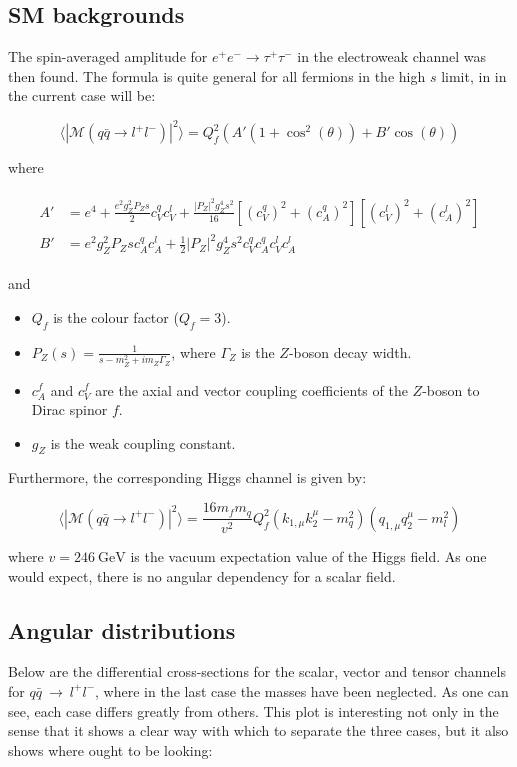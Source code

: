 \documentclass[11pt,a4paper]{article}
\begin{document}
\subsection{SM backgrounds}
The spin-averaged amplitude for $e^+e^- \rightarrow \tau^+\tau^-$ in the electroweak channel was then found. The formula is quite general for all fermions in the high $s$ limit, in in the current case will be:

\begin{equation}
	\langle|\mathcal{M}(q\bar{q}\rightarrow l^+l^-)|^2\rangle = Q_f^2\left(A'\left(1+\cos^2(\theta)\right) + B'\cos(\theta)\right)
\end{equation}

where

\begin{align}
	\begin{split}
	A' &= e^4 + \frac{e^2g_Z^2P_Zs}{2}c_V^qc_V^l + \frac{|P_Z|^2 g_Z^4 s^2}{16}\left[\left(c_V^q\right)^2 + \left(c_A^q\right)^2\right]\left[\left(c_V^l\right)^2 + \left(c_A^l\right)^2\right]\\
	B' &= e^2g_Z^2P_Zsc_A^qc_A^l + \frac{1}{2}|P_Z|^2g_Z^4s^2 c_V^qc_A^qc_V^l c_A^l
	\end{split}
\end{align}

and
\begin{itemize}
	\item $Q_f$ is the colour factor ($Q_f = 3$).
	\item $P_Z(s) = \frac{1}{s-m_Z^2 + im_Z\Gamma_Z}$, where $\Gamma_Z$ is the $Z$-boson decay width.
	\item $c^f_A$ and $c^f_V$ are the axial and vector coupling coefficients of the $Z$-boson to Dirac spinor $f$.
	\item $g_Z$ is the weak coupling constant.
\end{itemize}

Furthermore, the corresponding Higgs channel is given by:

\begin{equation}
	\langle|\mathcal{M}(q\bar{q}\rightarrow l^+l^-)|^2\rangle = \frac{16m_fm_q}{v^2}Q_f^2\left(k_{1,\mu}k_2^\mu - m_q^2\right)\left(q_{1,\mu}q_2^\mu - m_l^2\right)
\end{equation}

where $v=246\:\text{GeV}$ is the vacuum expectation value of the Higgs field. As one would expect, there is no angular dependency for a scalar field.

\subsection{Angular distributions}
Below are the differential cross-sections for the scalar, vector and tensor channels for $q\bar{q}\:\rightarrow\:l^+l^-$, where in the last case the masses have been neglected. As one can see, each case differs greatly from others. This plot is interesting not only in the sense that it shows a clear way with which to separate the three cases, but it also shows where ought to be looking:
\end{document}
